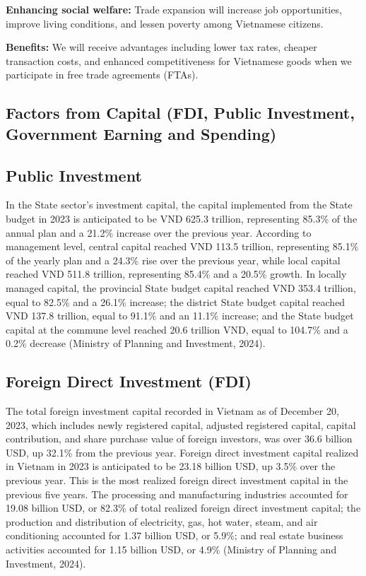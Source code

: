 \documentclass{article}
\begin{document}
\textbf{Enhancing social welfare:} Trade expansion will increase job opportunities, improve living conditions, and lessen poverty among Vietnamese citizens.

\textbf{Benefits:} We will receive advantages including lower tax rates, cheaper transaction costs, and enhanced competitiveness for Vietnamese goods when we participate in free trade agreements (FTAs).

\subsection*{Factors from Capital (FDI, Public Investment, Government Earning and Spending)}

\subsection*{Public Investment}
In the State sector's investment capital, the capital implemented from the State budget in 2023 is anticipated to be VND 625.3 trillion, representing 85.3\% of the annual plan and a 21.2\% increase over the previous year.  
According to management level, central capital reached VND 113.5 trillion, representing 85.1\% of the yearly plan and a 24.3\% rise over the previous year, while local capital reached VND 511.8 trillion, representing 85.4\% and a 20.5\% growth.  
In locally managed capital, the provincial State budget capital reached VND 353.4 trillion, equal to 82.5\% and a 26.1\% increase; the district State budget capital reached VND 137.8 trillion, equal to 91.1\% and an 11.1\% increase; and the State budget capital at the commune level reached 20.6 trillion VND, equal to 104.7\% and a 0.2\% decrease (Ministry of Planning and Investment, 2024).

\subsection*{Foreign Direct Investment (FDI)}
The total foreign investment capital recorded in Vietnam as of December 20, 2023, which includes newly registered capital, adjusted registered capital, capital contribution, and share purchase value of foreign investors, was over 36.6 billion USD, up 32.1\% from the previous year.  
Foreign direct investment capital realized in Vietnam in 2023 is anticipated to be 23.18 billion USD, up 3.5\% over the previous year.  
This is the most realized foreign direct investment capital in the previous five years.  
The processing and manufacturing industries accounted for 19.08 billion USD, or 82.3\% of total realized foreign direct investment capital; the production and distribution of electricity, gas, hot water, steam, and air conditioning accounted for 1.37 billion USD, or 5.9\%; and real estate business activities accounted for 1.15 billion USD, or 4.9\% (Ministry of Planning and Investment, 2024).
\end{document}
